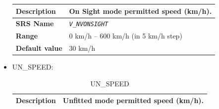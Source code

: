 \begin{itemize}
\begin{longtable}{|l|l|}
					\begin{minipage}[t]{0.22\linewidth} \textbf{Description}	\end{minipage}
				&	\begin{minipage}[t]{0.78\linewidth} On Sight mode permitted speed (km/h). \end{minipage} \\

				\hline

					\begin{minipage}[t]{0.22\linewidth} \textbf{SRS Name}	\end{minipage}
				&	\begin{minipage}[t]{0.78\linewidth} \emph{\texttt{V\_NVONSIGHT}} \end{minipage} \\

				\hline

					\begin{minipage}[t]{0.22\linewidth} \textbf{Range}	\end{minipage}
				&	\begin{minipage}[t]{0.78\linewidth} 0 km/h – 600 km/h (in 5 km/h step) \end{minipage} \\

				\hline

					\begin{minipage}[t]{0.22\linewidth} \textbf{Default value}	\end{minipage}
				&	\begin{minipage}[t]{0.78\linewidth} 30 km/h \end{minipage} \\

				\hline

			\end{longtable}

		\item UN\_SPEED:
			\begin{longtable}{|l|l|}
				\caption{UN\_SPEED}\\
				\hline

					\begin{minipage}[t]{0.22\linewidth} \textbf{Description}	\end{minipage}
				&	\begin{minipage}[t]{0.78\linewidth} Unfitted mode permitted speed (km/h). \end{minipage} \\

				\hline


\end{longtable}
\end{itemize}

